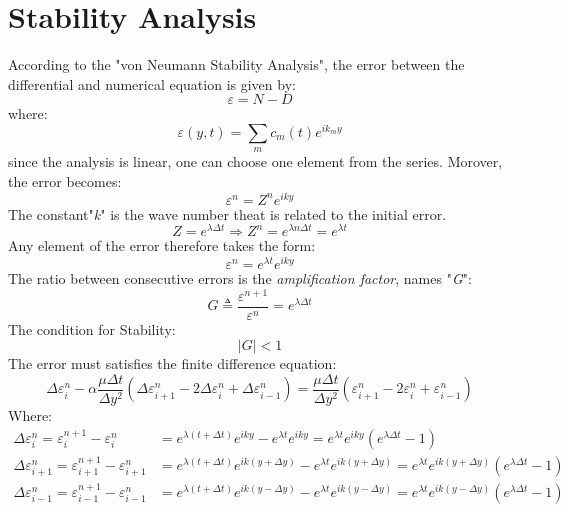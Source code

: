 \documentclass[11pt, a4paper]{article}
\begin{document}
\section{Stability Analysis}
According to the "von Neumann Stability Analysis", the error between the differential and numerical equation is given by:
\begin{equation}
    \varepsilon = N-D
\end{equation}
where:
\begin{equation}
    \varepsilon(y,t)=\sum_{m}c_m(t)e^{ik_my}
\end{equation}
since the analysis is linear, one can choose one element from the series. Morover, the error becomes:
\begin{equation}
    \varepsilon^n=Z^ne^{iky}
\end{equation}
The constant"\emph{k}" is the wave number theat is related to the initial error.
\begin{equation}
    Z=e^{\lambda\Delta t} \Rightarrow Z^n = e^{\lambda n\Delta t} = e^{\lambda t}
\end{equation}
Any element of the error therefore takes the form:
\begin{equation}
    \varepsilon^n = e^{\lambda  t}e^{iky}
\end{equation}
The ratio between consecutive errors is the \emph{amplification factor}, names "\emph{G}":
\begin{equation}
    G \triangleq \frac{\varepsilon^{n+1}}{\varepsilon^n} = e^{\lambda\Delta t}
\end{equation}
The condition for Stability:
\begin{equation}
    |G| < 1
\end{equation}
The error must satisfies the finite difference equation:
\begin{equation}
    \Delta \varepsilon^n_i - \alpha\frac{\mu\Delta t}{\Delta y^2}\left(\Delta \varepsilon^n_{i+1}-2\Delta \varepsilon^n_i + \Delta \varepsilon^n_{i-1}\right) = \frac{\mu\Delta t}{\Delta y^2}\left(\varepsilon^n_{i+1} - 2\varepsilon^n_{i} + \varepsilon^n_{i-1}\right)
\end{equation}
Where:
\begin{align}
    \Delta\varepsilon^n_i = \varepsilon^{n+1}_i - \varepsilon^n_i &=e^{\lambda\left(t+\Delta t\right)}e^{iky} - e^{\lambda t}e^{iky} = e^{\lambda t}e^{iky}\left(e^{\lambda\Delta t}-1\right)\\
    \Delta\varepsilon^n_{i+1} = \varepsilon^{n+1}_{i+1} - \varepsilon^n_{i+1} &= e^{\lambda\left(t+\Delta t\right)}e^{ik\left(y+\Delta y\right)} - e^{\lambda t}e^{ik\left(y+\Delta y\right)} = e^{\lambda t}e^{ik\left(y+\Delta y\right)}\left(e^{\lambda\Delta t}-1\right)\\
    \Delta\varepsilon^n_{i-1} = \varepsilon^{n+1}_{i-1} - \varepsilon^n_{i-1} &= e^{\lambda\left(t+\Delta t\right)}e^{ik\left(y-\Delta y\right)} - e^{\lambda t}e^{ik\left(y-\Delta y\right)} = e^{\lambda t}e^{ik\left(y-\Delta y\right)}\left(e^{\lambda\Delta t}-1\right)
\end{align}
\end{document}
